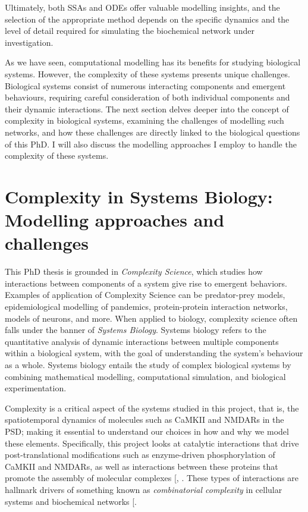\documentclass[
  11pt,
  letterpaper,
]{scrreprt}
\begin{document}
Ultimately, both SSAs and ODEs offer valuable modelling insights, and
the selection of the appropriate method depends on the specific dynamics
and the level of detail required for simulating the biochemical network
under investigation.

As we have seen, computational modelling has its benefits for studying
biological systems. However, the complexity of these systems presents
unique challenges. Biological systems consist of numerous interacting
components and emergent behaviours, requiring careful consideration of
both individual components and their dynamic interactions. The next
section delves deeper into the concept of complexity in biological
systems, examining the challenges of modelling such networks, and how
these challenges are directly linked to the biological questions of this
PhD. I will also discuss the modelling approaches I employ to handle the
complexity of these systems.

\section{Complexity in Systems Biology: Modelling approaches and
challenges}\label{sec-complexity-systems-biology}

This PhD thesis is grounded in \emph{Complexity Science}, which studies
how interactions between components of a system give rise to emergent
behaviors. Examples of application of Complexity Science can be
predator-prey models, epidemiological modelling of pandemics,
protein-protein interaction networks, models of neurons, and more. When
applied to biology, complexity science often falls under the banner of
\emph{Systems Biology}. Systems biology refers to the quantitative
analysis of dynamic interactions between multiple components within a
biological system, with the goal of understanding the system's behaviour
as a whole. Systems biology entails the study of complex biological
systems by combining mathematical modelling, computational simulation,
and biological experimentation.

Complexity is a critical aspect of the systems studied in this project,
that is, the spatiotemporal dynamics of molecules such as CaMKII and
NMDARs in the PSD; making it essential to understand our choices in how
and why we model these elements. Specifically, this project looks at
catalytic interactions that drive post-translational modifications such
as enzyme-driven phosphorylation of CaMKII and NMDARs, as well as
interactions between these proteins that promote the assembly of
molecular complexes {[},
\citeproc{ref-2015Biochemical}{10}{]}. These types of interactions are
hallmark drivers of something known as \emph{combinatorial complexity}
in cellular systems and biochemical networks
{[}\citeproc{ref-klamt2002Combinatorial}{282}{]}.
\end{document}
